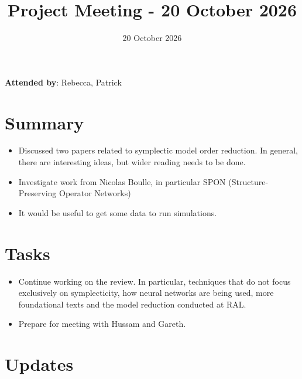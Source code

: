 \documentclass{article}
\title{Project Meeting - 20 October 2026}
\date{20 October 2026}
\begin{document}
\maketitle

\textbf{Attended by}: Rebecca, Patrick


\section{Summary}

\begin{itemize}
    \item Discussed two papers related to symplectic model order reduction. In general, there are interesting ideas, but wider reading needs to be done.
    \item Investigate work from Nicolas Boulle, in particular SPON (Structure-Preserving Operator Networks)
    \item It would be useful to get some data to run simulations. 
\end{itemize}


\section{Tasks}

\begin{itemize}
    \item Continue working on the review. In particular, techniques that do not focus exclusively on symplecticity, how neural networks are being used, more foundational texts and the model reduction conducted at RAL. 
    \item Prepare for meeting with Hussam and Gareth.
\end{itemize}

\section{Updates}
\end{document}
